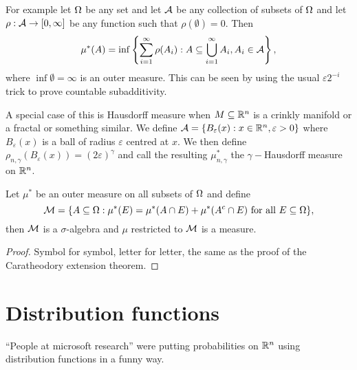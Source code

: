 For example let ${{\Omega}}$ be any set and let ${\mathcal{A}}$ be any collection of subsets of ${{\Omega}}$ and let $\rho : {\mathcal{A}} \to [0,\infty]$ be any function such that $\rho(\emptyset)=0$. Then 
\[\mu^*(A)= \inf\left\{\sum_{i=1}^\infty \rho(A_i): A \subseteq \bigcup_{i=1}^\infty A_i, A_i \in {\mathcal{A}} \right\}, \]
where $\inf \emptyset=\infty$ is an outer measure. This can be seen by using the usual $\varepsilon2^{-i}$ trick to prove countable subadditivity.

A special case of this is Hausdorff measure when $M \subseteq {\mathbb R}^n$ is a crinkly manifold or a fractal or something similar. We define ${\mathcal{A}} =\{B_\varepsilon(x):x\in {\mathbb R}^n, \varepsilon>0\}$ where $B_\varepsilon(x)$ is a ball of radius $\varepsilon$ centred at $x$. We then define $\rho_{n,\gamma}(B_\varepsilon(x))=(2\varepsilon)^\gamma$ and call the resulting $\mu_{n,\gamma}^*$ the $\gamma-$Hausdorff measure on ${\mathbb R}^n$.

\begin{thrm}
    Let $\mu^*$ be an outer measure on all subsets of ${{\Omega}}$ and define
    \[{\mathcal{M}} = \{A \subseteq {{\Omega}} : \mu^*(E) =\mu^*(A \cap E) + \mu^*(A^c \cap E) \text{ for all } E \subseteq {{\Omega}}\}, \]
    then ${\mathcal{M}}$ is a $\sigma$-algebra and $\mu$ restricted to ${\mathcal{M}}$ is a measure.
\end{thrm}
\begin{proof}
    Symbol for symbol, letter for letter, the same as the proof of the Caratheodory extension theorem.
\end{proof}
\section{Distribution functions}
``People at microsoft research'' were putting probabilities on ${\mathbb R}^n$ using distribution functions in a funny way. 

